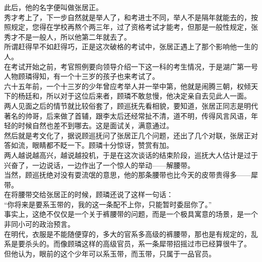 \begin{multicols}{\theparacolNo}
此后，他的名字便叫做张居正。\\

秀才考上了，下一步自然就是举人了，和考进士不同，举人不是隔年就能去的，按照规定，您得在学校再熬个两三年，过了资格考试才能考，但那是一般性规定，张秀才不是一般人，所以他第二年就去了。\\

所谓赶得早不如赶得巧，正是这次破格的考试中，张居正遇上了那个影响他一生的人。\\

在考试开始之前，考官照例要向领导介绍一下这一科的考生情况，于是湖广第一号人物顾璘得知，有一个十三岁的孩子也来考试了。\\

六十五年前，一个十三岁的少年曾应考举人并一举中第，他就是闹腾三朝，权倾天下的杨廷和，所以对于这位后来者，顾璘不敢怠慢，他决定亲自去见此人一面。\\

两人见面之后的情节就比较俗套了，顾巡抚先看相貌，要知道，张居正同志是明代著名的帅哥，后来做了首辅，跟李太后还经常扯不清，道不明，传得风言风语，年轻的时候自然也差不到哪去。这是面试关，满意通过。\\

然后就是考文化了，据说顾巡抚问了张居正几个问题，还出了几个对联，张居正对答如流，眼睛都不眨一下。顾璘十分惊讶，赞赏有加。\\

两人越说越高兴，越说越投机，于是在这次谈话的结束阶段，巡抚大人估计是过于兴奋了，一边说话，一边作出了一个惊人的举动——解腰带。\\

当然，顾巡抚绝对没有耍流氓的意思，他的那条腰带也比今天的皮带贵得多——犀带。\\

在将腰带交给张居正的时候，顾璘还说了这样一句话：\\

“你将来是要系玉带的，我的这一条配不上你，只能暂时委屈你了。”\\

事实上，这绝不仅仅是一个关于裤腰带的问题，而是一个极具寓意的场景，是一个非同小可的政治预言。\\

在明代，衣服是不能随便穿的，多大的官系多高级的裤腰带，那也是有规定的，乱系是要杀头的。而像顾璘这样的高级官员，系一条犀带招摇过市已经算很牛了。\\

但他认为，眼前的这个少年可以系玉带，而玉带，只属于一品官员。\\


\end{multicols}
